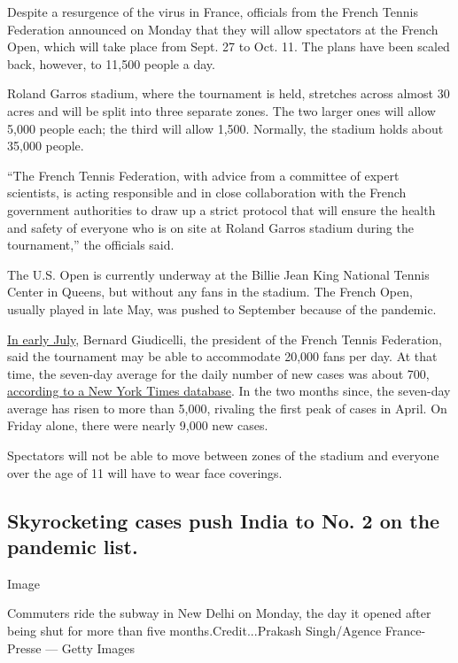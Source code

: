 Despite a resurgence of the virus in France, officials from the French
Tennis Federation announced on Monday that they will allow spectators at
the French Open, which will take place from Sept. 27 to Oct. 11. The
plans have been scaled back, however, to 11,500 people a day.

Roland Garros stadium, where the tournament is held, stretches across
almost 30 acres and will be split into three separate zones. The two
larger ones will allow 5,000 people each; the third will allow 1,500.
Normally, the stadium holds about 35,000 people.

``The French Tennis Federation, with advice from a committee of expert
scientists, is acting responsible and in close collaboration with the
French government authorities to draw up a strict protocol that will
ensure the health and safety of everyone who is on site at Roland Garros
stadium during the tournament,'' the officials said.

The U.S. Open is currently underway at the Billie Jean King National
Tennis Center in Queens, but without any fans in the stadium. The French
Open, usually played in late May, was pushed to September because of the
pandemic.

\href{https://www.nytimes3xbfgragh.onion/2020/07/02/sports/tennis/french-open-fans.html?searchResultPosition=3}{In
early July}, Bernard Giudicelli, the president of the French Tennis
Federation, said the tournament may be able to accommodate 20,000 fans
per day. At that time, the seven-day average for the daily number of new
cases was about 700,
\href{https://www.nytimes3xbfgragh.onion/interactive/2020/world/europe/france-coronavirus-cases.html}{according
to a New York Times database}. In the two months since, the seven-day
average has risen to more than 5,000, rivaling the first peak of cases
in April. On Friday alone, there were nearly 9,000 new cases.

Spectators will not be able to move between zones of the stadium and
everyone over the age of 11 will have to wear face coverings.

\hypertarget{skyrocketing-cases-push-india-to-no-2-on-the-pandemic-list}{%
\subsection{Skyrocketing cases push India to No. 2 on the pandemic
list.}\label{skyrocketing-cases-push-india-to-no-2-on-the-pandemic-list}}

Image

Commuters ride the subway in New Delhi on Monday, the day it opened
after being shut for more than five months.Credit...Prakash Singh/Agence
France-Presse --- Getty Images

